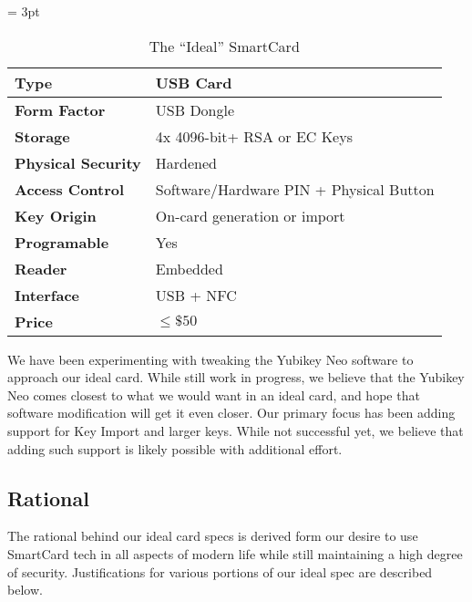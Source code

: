 \documentclass[11pt, twocolumn]{article}
\begin{document}
\begin{table*}[!htb]
  \vspace{3ex}
  \begin{center}
    \tabulinesep = 3pt
    \begin{tabu} to \textwidth
      { | X[1,c,m]
        | X[2,c,m]
        | }
      \hline
      \textbf{Type}
      & USB Card
      \\ \hline
      \textbf{Form Factor}
      & USB Dongle
      \\ \hline
      \textbf{Storage}
      & 4x 4096-bit+ RSA or EC Keys
      \\ \hline
      \textbf{Physical Security}
      & Hardened
      \\ \hline
      \textbf{Access Control}
      & Software/Hardware PIN + Physical Button
      \\ \hline
      \textbf{Key Origin}
      & On-card generation or import
      \\ \hline
      \textbf{Programable}
      & Yes
      \\ \hline
      \textbf{Reader}
      & Embedded
      \\ \hline
      \textbf{Interface}
      & USB + NFC
      \\ \hline
      \textbf{Price}
      & $\le\$50$
      \\ \hline
      \end{tabu}
  \end{center}
  \caption{The ``Ideal'' SmartCard}
  \label{tab:ideal}
\end{table*}

We have been experimenting with tweaking the Yubikey Neo software to
approach our ideal card. While still work in progress, we believe that
the Yubikey Neo comes closest to what we would want in an ideal card,
and hope that software modification will get it even closer. Our
primary focus has been adding support for Key Import and larger
keys. While not successful yet, we believe that adding such support is
likely possible with additional effort.

\subsection{Rational}

The rational behind our ideal card specs is derived form our desire to
use SmartCard tech in all aspects of modern life while still
maintaining a high degree of security. Justifications for various
portions of our ideal spec are described below.
\end{document}
